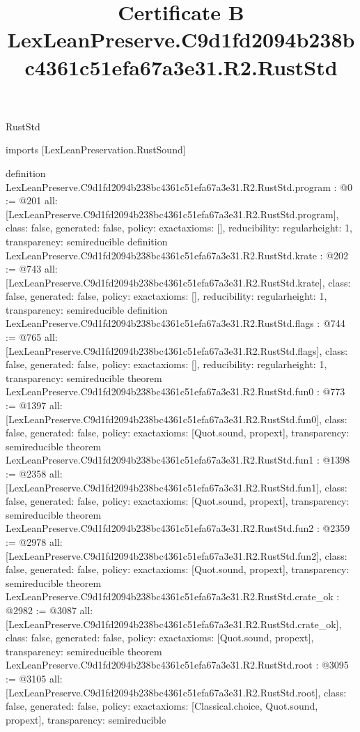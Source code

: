 \begin{lexlean}{RustStd}
\title{Certificate B LexLeanPreserve.C9d1fd2094b238bc4361c51efa67a3e31.R2.RustStd}
\begin{coremodule}
imports [LexLeanPreservation.RustSound]

definition LexLeanPreserve.C9d1fd2094b238bc4361c51efa67a3e31.R2.RustStd.program : @0 := @201 {
  all: [LexLeanPreserve.C9d1fd2094b238bc4361c51efa67a3e31.R2.RustStd.program],
  class: false,
  generated: false,
  policy: exact{axioms: []},
  reducibility: regular{height: 1},
  transparency: semireducible
}
definition LexLeanPreserve.C9d1fd2094b238bc4361c51efa67a3e31.R2.RustStd.krate : @202 := @743 {
  all: [LexLeanPreserve.C9d1fd2094b238bc4361c51efa67a3e31.R2.RustStd.krate],
  class: false,
  generated: false,
  policy: exact{axioms: []},
  reducibility: regular{height: 1},
  transparency: semireducible
}
definition LexLeanPreserve.C9d1fd2094b238bc4361c51efa67a3e31.R2.RustStd.flags : @744 := @765 {
  all: [LexLeanPreserve.C9d1fd2094b238bc4361c51efa67a3e31.R2.RustStd.flags],
  class: false,
  generated: false,
  policy: exact{axioms: []},
  reducibility: regular{height: 1},
  transparency: semireducible
}
theorem LexLeanPreserve.C9d1fd2094b238bc4361c51efa67a3e31.R2.RustStd.fun0 : @773 := @1397 {
  all: [LexLeanPreserve.C9d1fd2094b238bc4361c51efa67a3e31.R2.RustStd.fun0],
  class: false,
  generated: false,
  policy: exact{axioms: [Quot.sound, propext]},
  transparency: semireducible
}
theorem LexLeanPreserve.C9d1fd2094b238bc4361c51efa67a3e31.R2.RustStd.fun1 : @1398 := @2358 {
  all: [LexLeanPreserve.C9d1fd2094b238bc4361c51efa67a3e31.R2.RustStd.fun1],
  class: false,
  generated: false,
  policy: exact{axioms: [Quot.sound, propext]},
  transparency: semireducible
}
theorem LexLeanPreserve.C9d1fd2094b238bc4361c51efa67a3e31.R2.RustStd.fun2 : @2359 := @2978 {
  all: [LexLeanPreserve.C9d1fd2094b238bc4361c51efa67a3e31.R2.RustStd.fun2],
  class: false,
  generated: false,
  policy: exact{axioms: [Quot.sound, propext]},
  transparency: semireducible
}
theorem LexLeanPreserve.C9d1fd2094b238bc4361c51efa67a3e31.R2.RustStd.crate_ok : @2982 := @3087 {
  all: [LexLeanPreserve.C9d1fd2094b238bc4361c51efa67a3e31.R2.RustStd.crate_ok],
  class: false,
  generated: false,
  policy: exact{axioms: [Quot.sound, propext]},
  transparency: semireducible
}
theorem LexLeanPreserve.C9d1fd2094b238bc4361c51efa67a3e31.R2.RustStd.root : @3095 := @3105 {
  all: [LexLeanPreserve.C9d1fd2094b238bc4361c51efa67a3e31.R2.RustStd.root],
  class: false,
  generated: false,
  policy: exact{axioms: [Classical.choice, Quot.sound, propext]},
  transparency: semireducible
}


\end{coremodule}
\end{lexlean}
